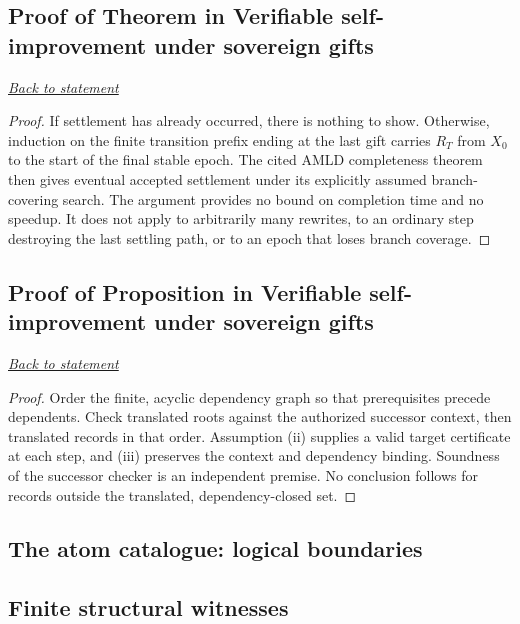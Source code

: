 \documentclass[11pt,letterpaper]{article}
\theoremstyle{definition}\newtheorem{definition}[theorem]{Definition}\newtheorem{example}[theorem]{Example}
\theoremstyle{remark}\newtheorem{remark}[theorem]{Remark}
\newcommand{\backlink}[1]{\noindent\hyperref[#1]{\textit{Back to statement}}\par\smallskip}
\begin{document}
\subsection{Proof of Theorem in Verifiable self-improvement under sovereign gifts}\label{br:mvsi:proof:4}\backlink{br:mvsi:stmt:4}
\begin{proof}
If settlement has already occurred, there is nothing to show. Otherwise, induction on the finite transition prefix ending at the last gift carries $R_T$ from $X_0$ to the start of the final stable epoch. The cited AMLD completeness theorem then gives eventual accepted settlement under its explicitly assumed branch-covering search. The argument provides no bound on completion time and no speedup. It does not apply to arbitrarily many rewrites, to an ordinary step destroying the last settling path, or to an epoch that loses branch coverage.
\end{proof}

\subsection{Proof of Proposition in Verifiable self-improvement under sovereign gifts}\label{br:mvsi:proof:5}\backlink{br:mvsi:stmt:5}
\begin{proof}
Order the finite, acyclic dependency graph so that prerequisites precede dependents. Check translated roots against the authorized successor context, then translated records in that order. Assumption (ii) supplies a valid target certificate at each step, and (iii) preserves the context and dependency binding. Soundness of the successor checker is an independent premise. No conclusion follows for records outside the translated, dependency-closed set.
\end{proof}

\subsection*{The atom catalogue: logical boundaries}


\subsection*{Finite structural witnesses}
\end{document}
